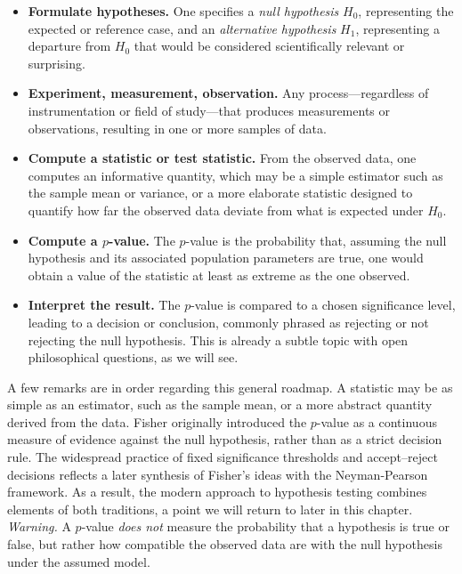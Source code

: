 \begin{itemize}
    \item \textbf{Formulate hypotheses.} One specifies a \textit{null hypothesis} \(H_0\), representing the expected or reference case, and an \textit{alternative hypothesis} \(H_1\), representing a departure from \(H_0\) that would be considered scientifically relevant or surprising.
    \item \textbf{Experiment, measurement, observation.} Any process—regardless of instrumentation or field of study—that produces measurements or observations, resulting in one or more samples of data.
    \item \textbf{Compute a statistic or test statistic.} From the observed data, one computes an informative quantity, which may be a simple estimator such as the sample mean or variance, or a more elaborate statistic designed to quantify how far the observed data deviate from what is expected under \(H_0\).
    \item \textbf{Compute a \(p\)-value.} The \(p\)-value is the probability that, assuming the null hypothesis and its associated population parameters are true, one would obtain a value of the statistic at least as extreme as the one observed.
    \item \textbf{Interpret the result.} The \(p\)-value is compared to a chosen significance level, leading to a decision or conclusion, commonly phrased as rejecting or not rejecting the null hypothesis. This is already a subtle topic with open philosophical questions, as we will see.
\end{itemize}

\medskip

A few remarks are in order regarding this general roadmap. A statistic may be as simple as an estimator, such as the sample mean, or a more abstract quantity derived from the data. Fisher originally introduced the \(p\)-value as a continuous measure of evidence against the null hypothesis, rather than as a strict decision rule. The widespread practice of fixed significance thresholds and accept--reject decisions reflects a later synthesis of Fisher’s ideas with the Neyman-Pearson framework. As a result, the modern approach to hypothesis testing combines elements of both traditions, a point we will return to later in this chapter. \textit{Warning.} A \(p\)-value \textit{does not} measure the probability that a hypothesis is true or false, but rather how compatible the observed data are with the null hypothesis under the assumed model.

